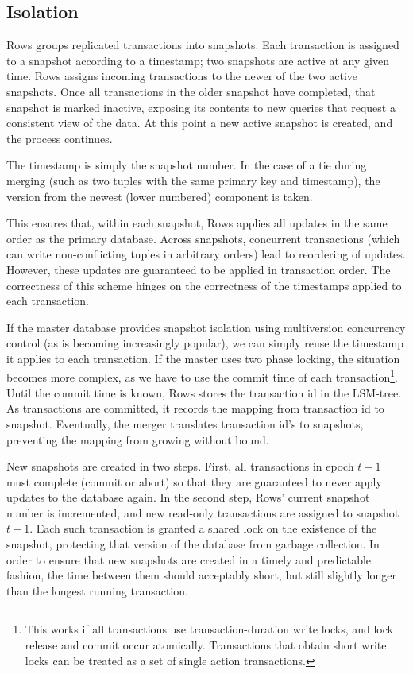 \documentclass{sig-alternate-sigmod08}
\newcommand{\rows}{Rows\xspace}
\newcommand{\rowss}{Rows'\xspace}
\begin{document}
\subsection{Isolation}

\rows groups replicated transactions into snapshots.  Each transaction
is assigned to a snapshot according to a timestamp; two snapshots are
active at any given time.  \rows assigns incoming transactions to the
newer of the two active snapshots.  Once all transactions in the older
snapshot have completed, that snapshot is marked inactive, exposing
its contents to new queries that request a consistent view of the
data.  At this point a new active snapshot is created, and the process
continues.

The timestamp is simply the snapshot number.  In the case of a tie
during merging (such as two tuples with the same primary key and
timestamp), the version from the newest (lower numbered) component is
taken.

This ensures that, within each snapshot, \rows applies all updates in the
same order as the primary database.  Across snapshots, concurrent
transactions (which can write non-conflicting tuples in arbitrary
orders) lead to reordering of updates.  However, these updates are
guaranteed to be applied in transaction order.  The correctness of
this scheme hinges on the correctness of the timestamps applied to
each transaction.

If the master database provides snapshot isolation using multiversion
concurrency control (as is becoming increasingly popular), we can
simply reuse the timestamp it applies to each transaction.  If the
master uses two phase locking, the situation becomes more complex, as
we have to use the commit time of each transaction\footnote{This works
  if all transactions use transaction-duration write locks, and lock
  release and commit occur atomically.  Transactions that obtain short
  write locks can be treated as a set of single action transactions.}.
Until the commit time is known, \rows stores the transaction id in the
LSM-tree.  As transactions are committed, it records the mapping from
transaction id to snapshot.  Eventually, the merger translates
transaction id's to snapshots, preventing the mapping from growing
without bound.

New snapshots are created in two steps.  First, all transactions in
epoch $t-1$ must complete (commit or abort) so that they are
guaranteed to never apply updates to the database again.  In the
second step, \rowss current snapshot number is incremented, and new
read-only transactions are assigned to snapshot $t-1$.  Each such
transaction is granted a shared lock on the existence of the snapshot,
protecting that version of the database from garbage collection.  In
order to ensure that new snapshots are created in a timely and
predictable fashion, the time between them should acceptably short,
but still slightly longer than the longest running transaction.
\end{document}

